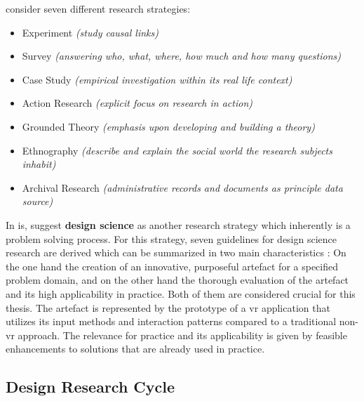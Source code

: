 \cite{Saunders2009} consider seven different research strategies:
\begin{itemize}[noitemsep,nolistsep]
	\item Experiment \textit{(study causal links)}
	\item Survey \textit{(answering who, what, where, how much and how many questions)}
	\item Case Study \textit{(empirical investigation within its real life context)}
	\item Action Research \textit{(explicit focus on research in action)}
	\item Grounded Theory \textit{(emphasis upon developing and building a theory)}
	\item Ethnography \textit{(describe and explain the social world the research subjects inhabit)}
	\item Archival Research \textit{(administrative records and documents as principle data source)}
\end{itemize}
In \gls{is}, \cite{Hevner2010} suggest \textbf{design science} as another research strategy which inherently is a problem solving process. For this strategy, seven guidelines for design science research are derived which can be summarized in two main characteristics \citep{Hevner2010}: On the one hand the creation of an innovative, purposeful artefact for a specified problem domain, and on the other hand the thorough evaluation of the artefact and its high applicability in practice. Both of them are considered crucial for this thesis. \newline
The artefact is represented by the prototype of a \gls{vr} application that utilizes its input methods and interaction patterns compared to a traditional non-\gls{vr} approach. The relevance for practice and its applicability is given by feasible enhancements to solutions that are already used in practice.



\subsection{Design Research Cycle}

\label{DSRCycle}

